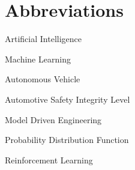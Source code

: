 


\section*{Abbreviations}
\begin{description}[font=\rmfamily\bfseries, leftmargin=3cm, style=nextline]
	\item[AI] Artificial Intelligence
	\item[ML] Machine Learning
	\item[AV] Autonomous Vehicle
	\item[ASIL] Automotive Safety Integrity Level
	\item[MDE] Model Driven Engineering
	\item[PDF] Probability Distribution Function
	\item[RL] Reinforcement Learning 
\end{description}